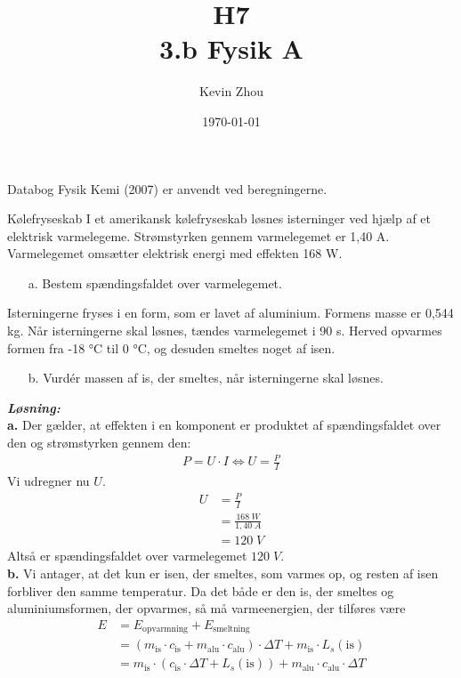 \documentclass{report}
\title{H7\\
{\Large \textbf{3.b Fysik A}}}
\author{Kevin Zhou}
\date{\today}
\newcommand{\sol}{\setlength{\parindent}{0cm}\textbf{\textit{Løsning:}}\setlength{\parindent}{1cm}}
\begin{document}
\maketitle
\begin{note}
  Databog Fysik Kemi (2007) er anvendt ved beregningerne.
\end{note}
\begin{question}{Kølefryseskab}{}
I et amerikansk kølefryseskab løsnes isterninger ved hjælp af et elektrisk varmelegeme. Strømstyrken gennem varmelegemet er 1,40 A. Varmelegemet omsætter elektrisk energi med effekten 168 W.
\begin{itemize}
  \item[a.] Bestem spændingsfaldet over varmelegemet.
\end{itemize}
Isterningerne fryses i en form, som er lavet af aluminium. Formens masse er 0,544 kg.
Når isterningerne skal løsnes, tændes varmelegemet i 90 s.
Herved opvarmes formen fra -18 °C til 0 °C, og desuden smeltes noget af isen.
\begin{itemize}
  \item[b.] Vurdér massen af is, der smeltes, når isterningerne skal løsnes.
\end{itemize}
\end{question}
\sol \\
\textbf{a.}
Der gælder, at effekten i en komponent er produktet af spændingsfaldet over den og strømstyrken gennem den:
\begin{equation*}
\begin{split}
  P=U \cdot I \iff U=\frac{P}{I}
\end{split}
\end{equation*}
Vi udregner nu $U$.
\begin{equation*}
\begin{split}
  U&=\frac{P}{I}\\
  &=\frac{168 \;\unit{W} }{1,40 \;\unit{A} }\\
  &=120 \;\unit{V} 
\end{split}
\end{equation*}
Altså er spændingsfaldet over varmelegemet $120 \;\unit{V} $. \\[1ex]
\textbf{b.}
Vi antager, at det kun er isen, der smeltes, som varmes op, og resten af isen forbliver den samme temperatur.
Da det både er den is, der smeltes og aluminiumsformen, der opvarmes, så må varmeenergien, der tilføres være 
\begin{equation*}
\begin{split}
  E&=E _{\text{opvarmning} } + E _{\text{smeltning} }\\
  &=\left(m _{\text{is} } \cdot c _{\text{is} } + m _{\text{alu} } \cdot c _{\text{alu} }\right) \cdot \Delta T + m _{\text{is} } \cdot L_s(\text{is})\\
  &=m _{\text{is} } \cdot \left(c _{\text{is} } \cdot \Delta T + L_s(\text{is} )\right) + m _{\text{alu} } \cdot c _{\text{alu} }\cdot \Delta T
\end{split}
\end{equation*}
\end{document}
